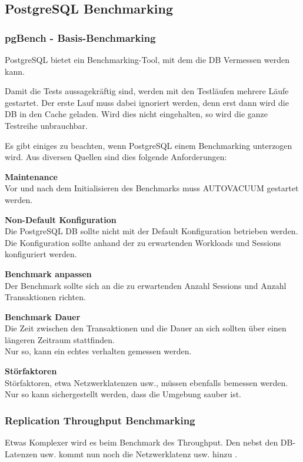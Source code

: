 
\begin{flushleft}
    \subsection{PostgreSQL Benchmarking}
    \subsubsection{pgBench - Basis-Benchmarking}
    PostgreSQL bietet ein Benchmarking-Tool,\cite{TYJFF7AB,VXNYQFTE} mit dem die DB Vermessen werden kann.
\end{flushleft}
\begin{flushleft}
    Damit die Tests aussagekräftig sind, werden mit den Testläufen mehrere Läufe gestartet.
    Der erste Lauf muss dabei ignoriert werden, denn erst dann wird die DB in den Cache geladen.
    Wird dies nicht eingehalten, so wird die ganze Testreihe unbrauchbar.
\end{flushleft}
\begin{flushleft}
    Es gibt einiges zu beachten, wenn PostgreSQL einem Benchmarking unterzogen wird.
    Aus diversen Quellen \cite{768DXXJK, 67TNVGTX, T3VEV98H, VXNYQFTE} sind dies folgende Anforderungen:
     \begin{description}
        \item \textbf{Maintenance}\hfill \\Vor und nach dem Initialisieren des Benchmarks muss \Gls{AUTOVACUUM} gestartet werden.
        \item \textbf{Non-Default Konfiguration}\hfill \\Die PostgreSQL DB sollte nicht mit der Default Konfiguration betrieben werden.\\Die Konfiguration sollte anhand der zu erwartenden Workloads und Sessions konfiguriert werden.
        \item \textbf{Benchmark anpassen}\hfill \\Der Benchmark sollte sich an die zu erwartenden Anzahl Sessions und Anzahl \Gls{Transaktion}en richten.
        \item \textbf{Benchmark Dauer}\hfill \\Die Zeit zwischen den \Gls{Transaktion}en und die Dauer an sich sollten über einen längeren Zeitraum stattfinden.\\Nur so, kann ein echtes verhalten gemessen werden.
        \item \textbf{Störfaktoren}\hfill \\Störfaktoren, etwa Netzwerklatenzen \cite{5VBTYNB7} usw.,
        müssen ebenfalls bemessen werden.\\Nur so kann sichergestellt werden, dass die Umgebung sauber ist.
    \end{description}
\end{flushleft}
\begin{flushleft}
    \subsubsection{Replication Throughput Benchmarking}
    Etwas Komplexer wird es beim Benchmark des Throughput.
    Den nebst den DB-Latenzen usw. kommt nun noch die Netzwerklatenz usw. hinzu \cite{UU5X5NID}.

\end{flushleft}